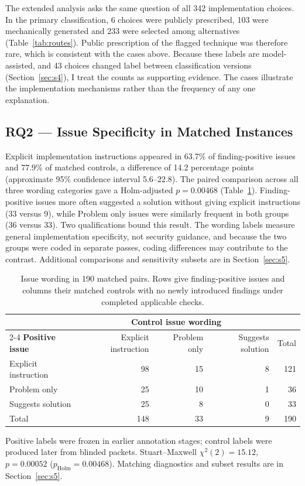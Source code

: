 \documentclass[acmsmall,screen,nonacm]{acmart}
\begin{document}
The extended analysis asks the same question of all 342 implementation choices. In the primary classification, 6 choices were publicly prescribed, 103 were mechanically generated and 233 were selected among alternatives (Table~\ref{tab:routes}). Public prescription of the flagged technique was therefore rare, which is consistent with the cases above. Because these labels are model-assisted, and 43 choices changed label between classification versions (Section~\ref{sec:s4}), I treat the counts as supporting evidence. The cases illustrate the implementation mechanisms rather than the frequency of any one explanation.

\subsection{RQ2 --- Issue Specificity in Matched Instances}\label{sec:rq2-res}

Explicit implementation instructions appeared in 63.7\% of finding-positive issues and 77.9\% of matched controls, a difference of 14.2 percentage points (approximate 95\% confidence interval 5.6--22.8). The paired comparison across all three wording categories gave a Holm-adjusted $p=0.00468$ (Table~\ref{tab:rq2}). Finding-positive issues more often suggested a solution without giving explicit instructions (33 versus 9), while Problem only issues were similarly frequent in both groups (36 versus 33). Two qualifications bound this result. The wording labels measure general implementation specificity, not security guidance, and because the two groups were coded in separate passes, coding differences may contribute to the contrast. Additional comparisons and sensitivity subsets are in Section~\ref{sec:s5}.

\begin{table}[H]
\caption{Issue wording in 190 matched pairs. Rows give finding-positive issues and columns their matched controls with no newly introduced findings under completed applicable checks.}
\label{tab:rq2}
\small
\begin{tabular}{@{}lrrrr@{}}
\toprule
& \multicolumn{3}{c}{\textbf{Control issue wording}} & \\
\cmidrule(lr){2-4}
\textbf{Positive issue} & Explicit instruction & Problem only & Suggests solution & Total\\
\midrule
Explicit instruction & 98 & 15 & 8 & 121\\
Problem only & 25 & 10 & 1 & 36\\
Suggests solution & 25 & 8 & 0 & 33\\
\midrule
Total & 148 & 33 & 9 & 190\\
\bottomrule
\end{tabular}
\par\smallskip\raggedright\footnotesize Positive labels were frozen in earlier annotation stages; control labels were produced later from blinded packets. Stuart--Maxwell $\chi^2(2)=15.12$, $p=0.00052$ ($p_{\mathrm{Holm}}=0.00468$). Matching diagnostics and subset results are in Section~\ref{sec:s5}.
\end{table}
\end{document}
